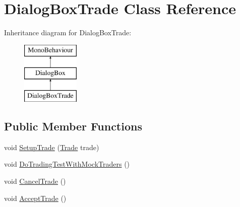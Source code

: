 \hypertarget{class_dialog_box_trade}{}\section{Dialog\+Box\+Trade Class Reference}
\label{class_dialog_box_trade}
Inheritance diagram for Dialog\+Box\+Trade\+:\begin{figure}[H]
\begin{center}
\leavevmode
\includegraphics[height=3.000000cm]{class_dialog_box_trade}
\end{center}
\end{figure}
\subsection*{Public Member Functions}
\begin{DoxyCompactItemize}
\item 
void \hyperlink{class_dialog_box_trade_a12e9eeb81e93b96ccbfa219fb1f8d05a}{Setup\+Trade} (\hyperlink{class_trade}{Trade} trade)
\item 
void \hyperlink{class_dialog_box_trade_a9ce90e25a84129f12e38ad55990638ed}{Do\+Trading\+Test\+With\+Mock\+Traders} ()
\item 
void \hyperlink{class_dialog_box_trade_a87df18554b7947420277cd1e9f0ee93b}{Cancel\+Trade} ()
\item 
void \hyperlink{class_dialog_box_trade_a4564302a9198b93145958cd75a22339a}{Accept\+Trade} ()
\end{DoxyCompactItemize}
